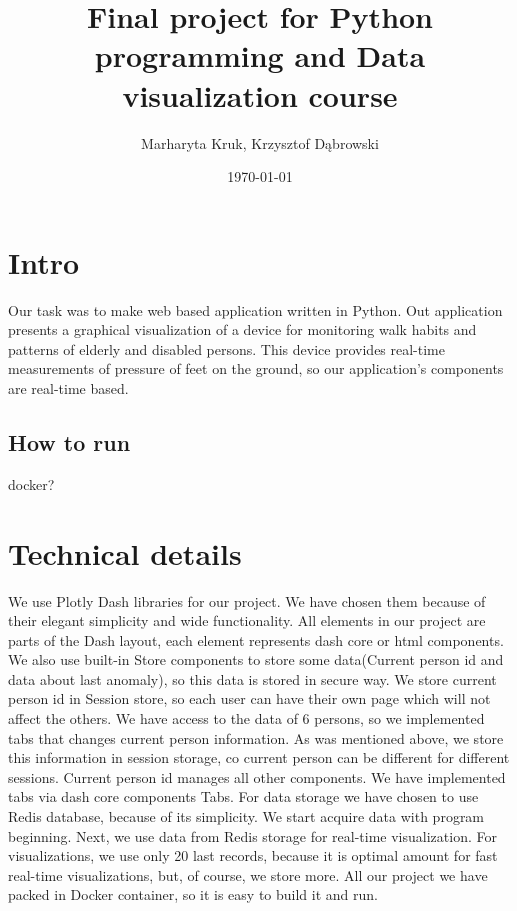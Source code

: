 \documentclass{article}
\title{Final project for Python programming and Data visualization course}
\author{Marharyta Kruk, Krzysztof Dąbrowski}
\date{\today}
\begin{document}
\maketitle
\tableofcontents
\newpage

\section{Intro}
Our task was to make web based application written in Python. Out application presents a graphical visualization of a device for monitoring walk habits and patterns of elderly and disabled persons.
This device provides real-time measurements of pressure of feet on the ground, so our application's components are real-time based.
\subsection{How to run}
docker?
\section{Technical details}
We use Plotly Dash libraries for our project. We have chosen them because of their elegant simplicity and wide functionality. All elements in our project are parts of the Dash layout, each element represents dash core or html components. We also use built-in Store components to store some data(Current person id and data about last anomaly), so this data is stored in secure way. We store current person id in Session store, so each user can have their own page which will not affect the others.
\newline
We have access to the data of 6 persons, so we implemented tabs that changes current person information. As was mentioned above, we store this information in session storage, co current person can be different for different sessions. Current person id manages all other components. We have implemented tabs via dash core components Tabs.
\newline
For data storage we have chosen to use Redis database, because of its simplicity. We start acquire data with program beginning. Next, we use data from Redis storage for real-time visualization. For visualizations, we use only 20 last records, because it is optimal amount for fast real-time visualizations, but, of course, we store more.
\newline
All our project we have packed in Docker container, so it is easy to build it and run.
\end{document}

